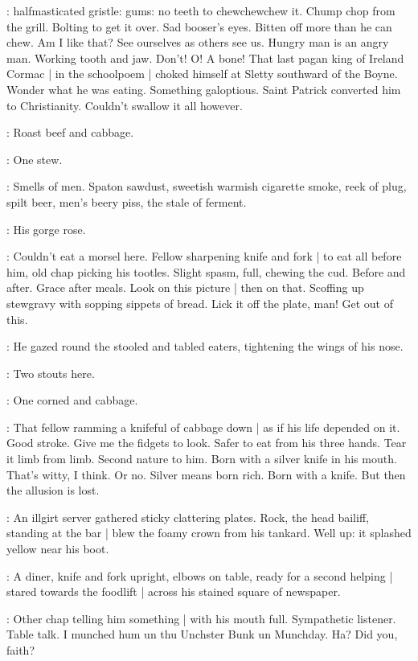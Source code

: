 \BloomInt:
halfmasticated gristle:
gums:
no teeth to chewchewchew it.
Chump chop from the grill.
Bolting to get it over.
Sad booser's eyes.
Bitten off more than he can chew.
Am I like that?
See ourselves as others see us.
Hungry man is an angry man.
Working tooth and jaw.
Don't!
O! A bone!
That last pagan king of Ireland Cormac |
in the schoolpoem |
choked himself at Sletty southward of the Boyne.
Wonder what he was eating.
Something galoptious.
Saint Patrick converted him to Christianity.
Couldn't swallow it all however.

:
Roast beef and cabbage.

:
One stew.

\BloomInt:
Smells of men.
Spaton sawdust,
sweetish warmish cigarette smoke,
reek of plug,
spilt beer,
men's beery piss,
the stale of ferment.

:
His gorge rose.

\BloomInt:
Couldn't eat a morsel here.
Fellow sharpening knife and fork |
to eat all before him,
old chap picking his tootles.
Slight spasm, full, chewing the cud.
Before and after.
Grace after meals.
Look on this picture |
then on that.
Scoffing up stewgravy with sopping sippets of bread.
Lick it off the plate, man!
Get out of this.

:
He gazed round the stooled and tabled eaters,
tightening the wings of his nose.

:
Two stouts here.

:
One corned and cabbage.

\BloomInt:
That fellow ramming a knifeful of cabbage down |
as if his life depended on it.
Good stroke.
Give me the fidgets to look.
Safer to eat from his three hands.
Tear it limb from limb.
Second nature to him.
Born with a silver knife in his mouth.
That's witty, I think.
Or no.
Silver means born rich.
Born with a knife.
But then the allusion is lost.

:
An illgirt server gathered sticky clattering plates.
Rock, the head bailiff,
standing at the bar |
blew the foamy crown from his tankard.
Well up:
it splashed yellow near his boot.

:
A diner, knife and fork upright,
elbows on table,
ready for a second helping |
stared towards the foodlift |
across his stained square of newspaper.

\BloomInt:
Other chap telling him something |
with his mouth full.
Sympathetic listener.
Table talk.
I munched hum un thu Unchster Bunk un Munchday.
Ha?
Did you, faith?

